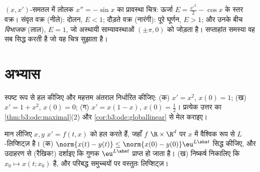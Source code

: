 \begin{omfigure}

{\small $(x, x')$-समतल में लोलक $x'' = -\sin x$ का प्रावस्था चित्र: ऊर्जा $E = \frac{x'^2}2
- \cos x$
के स्तर वक्र। संवृत वक्र (नीले): दोलन, $E < 1$; दौड़ते वक्र
(नारंगी): पूरे घूर्णन, $E > 1$; और उनके बीच \emph{विभाजक} (लाल),
$E = 1$, जो अस्थायी साम्यावस्थाओं $(\pm\pi, 0)$ को जोड़ता है। सप्ताहांत
समस्या वह सब सिद्ध करती है जो यह चित्र सुझाता है।}
\end{omfigure}

\section{अभ्यास}

\begin{exercise}[$\star$]\label{exo:b3:ode:1}
स्पष्ट रूप से हल कीजिए और महत्तम अंतराल निर्धारित कीजिए:
(क) $x' = x^2$, $x(0) = 1$; (ख) $x' = 1 + x^2$, $x(0) = 0$; (ग) $x' = x(1-x)$, $x(0) = \frac12$। प्रत्येक
उत्तर का \cref{thm:b3:ode:maximal}(2) और \cref{cor:b3:ode:globallinear} से मेल कराइए।
\end{exercise}

\begin{exercise}[$\star$]\label{exo:b3:ode:2}
मान लीजिए $x, y$ $x' = f(t,x)$ को हल करते हैं, जहाँ $f$ $\R\times\R^d$ पर $x$
में वैश्विक रूप से $L$-लिप्शिट्ज़ है।
(क) $\norm{x(t) - y(t)} \leq \norm{x(0) -
y(0)}\eu^{L\abs t}$ सिद्ध कीजिए, और उदाहरण से (रैखिक!) दर्शाइए कि गुणक
$\eu^{L\abs t}$ प्राप्त हो जाता है।
(ख) निष्कर्ष निकालिए कि  $x_0 \mapsto x(t; x_0)$  है, और
परिबद्ध समुच्चयों पर वस्तुतः लिप्शिट्ज़।
\end{exercise}

